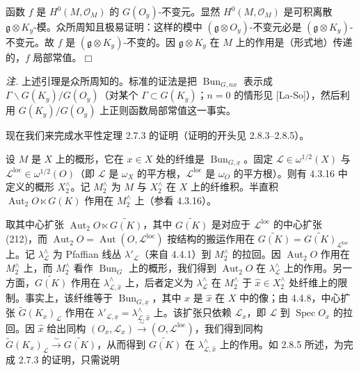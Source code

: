 
函数 $f$ 是 $H^{0}(M,\mathcal{O}_{M})$ 的 $G(O_{y})$-不变元。显然 $H^{0}(M,\mathcal{O}_{M})$ 是可积离散 $\mathfrak{g}\otimes K_{y}$-模。众所周知且极易证明：这样的模中 $(\mathfrak{g}\otimes O_{y})$-不变元必是 $(\mathfrak{g}\otimes K_{y})$-不变元。故 $f$ 是 $(\mathfrak{g}\otimes K_{y})$-不变的。因 $\mathfrak{g}\otimes K_{y}$ 在 $M$ 上的作用是（形式地）传递的，$f$ 局部常值。\hfill$\Box$

\emph{注.} 上述引理是众所周知的。标准的证法是把 $\operatorname{Bun}_{G,nx}$ 表示成 $\Gamma\backslash G(K_{y})/G(O_{y})$（对某个 $\Gamma\subset G(K_{y})$；$n=0$ 的情形见 [La-So]），然后利用 $G(K_{y})/G(O_{y})$ 上正则函数局部常值这一事实。

 现在我们来完成水平性定理 2.7.3 的证明（证明的开头见 2.8.3–2.8.5）。

设 $M$ 是 $X$ 上的概形，它在 $x\in X$ 处的纤维是 $\operatorname{Bun}_{G,\underline{x}}$。固定 $\mathcal{L}\in\omega^{1/2}(X)$ 与 $\mathcal{L}^{\mathrm{loc}}\in\omega^{1/2}(O)$（即 $\mathcal{L}$ 是 $\omega_{X}$ 的平方根，$\mathcal{L}^{\mathrm{loc}}$ 是 $\omega_{O}$ 的平方根）。则有 4.3.16 中定义的概形 $X_{2}^{\wedge}$。记 $M_{2}^{\wedge}$ 为 $M$ 与 $X_{2}^{\wedge}$ 在 $X$ 上的纤维积。半直积 $\operatorname{Aut}_{2}O\ltimes G(K)$ 作用在 $M_{2}^{\wedge}$ 上（参看 4.3.16）。

取其中心扩张 $\operatorname{Aut}_{2}O\ltimes\widetilde{G(K)}$，其中 $\widetilde{G(K)}$ 是对应于 $\mathcal{L}^{\mathrm{loc}}$ 的中心扩张 (212)，而 $\operatorname{Aut}_{2}O=\operatorname{Aut}(O,\mathcal{L}^{\mathrm{loc}})$ 按结构的搬运作用在 $\widetilde{G(K)}=\widetilde{G(K)}_{\mathcal{L}^{\mathrm{loc}}}$ 上。记 $\lambda_{\mathcal{L}}^{\wedge}$ 为 Pfaffian 线丛 $\lambda'_{\mathcal{L}}$（来自 4.4.1）到 $M_{2}^{\wedge}$ 的拉回。因 $\operatorname{Aut}_{2}O$ 作用在 $M_{2}^{\wedge}$ 上，而 $M_{2}^{\wedge}$ 看作 $\operatorname{Bun}_{G}$ 上的概形，我们得到 $\operatorname{Aut}_{2}O$ 在 $\lambda_{\mathcal{L}}^{\wedge}$ 上的作用。另一方面，$\widetilde{G(K)}$ 作用在 $\lambda_{\mathcal{L},\hat x}^{\wedge}$ 上，后者定义为 $\lambda_{\mathcal{L}}^{\wedge}$ 在 $M_{2}^{\wedge}$ 于 $\hat x\in X_{2}^{\wedge}$ 处纤维上的限制。事实上，该纤维等于 $\operatorname{Bun}_{G,\underline{x}}$，其中 $x$ 是 $\hat x$ 在 $X$ 中的像；由 4.4.8，中心扩张 $\tilde{G}(K_{x})_{\mathcal{L}}$ 作用在 $\lambda'_{\mathcal{L},\underline{x}}=\lambda_{\mathcal{L},\hat x}^{\wedge}$ 上。该扩张只依赖 $\mathcal{L}_{x}$，即 $\mathcal{L}$ 到 $\operatorname{Spec}O_{x}$ 的拉回。因 $\hat x$ 给出同构 $(O_{x},\mathcal{L}_{x})\xrightarrow{\ \sim\ }(O,\mathcal{L}^{\mathrm{loc}})$，我们得到同构 $\tilde{G}(K_{x})_{\mathcal{L}}\xrightarrow{\ \sim\ }\widetilde{G(K)}$，从而得到 $\widetilde{G(K)}$ 在 $\lambda_{\mathcal{L},\hat x}^{\wedge}$ 上的作用。如 2.8.5 所述，为完成 2.7.3 的证明，只需说明

